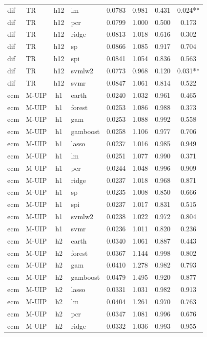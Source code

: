 \begin{ThreePartTable}
\begin{longtable}[t]{llclcccc}
dif & TR & h12 & lm & 0.0783 & 0.981 & 0.431 & 0.024**\\
dif & TR & h12 & pcr & 0.0799 & 1.000 & 0.500 & 0.173\\
dif & TR & h12 & ridge & 0.0813 & 1.018 & 0.616 & 0.302\\
dif & TR & h12 & sp & 0.0866 & 1.085 & 0.917 & 0.704\\
dif & TR & h12 & spi & 0.0841 & 1.054 & 0.836 & 0.563\\
dif & TR & h12 & svmlw2 & 0.0773 & 0.968 & 0.120 & 0.031**\\
dif & TR & h12 & svmr & 0.0847 & 1.061 & 0.814 & 0.522\\
\addlinespace
ecm & M-UIP & h1 & earth & 0.0240 & 1.032 & 0.961 & 0.465\\
ecm & M-UIP & h1 & forest & 0.0253 & 1.086 & 0.988 & 0.373\\
ecm & M-UIP & h1 & gam & 0.0253 & 1.088 & 0.992 & 0.558\\
ecm & M-UIP & h1 & gamboost & 0.0258 & 1.106 & 0.977 & 0.706\\
ecm & M-UIP & h1 & lasso & 0.0237 & 1.016 & 0.985 & 0.949\\
ecm & M-UIP & h1 & lm & 0.0251 & 1.077 & 0.990 & 0.371\\
ecm & M-UIP & h1 & pcr & 0.0244 & 1.048 & 0.996 & 0.909\\
ecm & M-UIP & h1 & ridge & 0.0237 & 1.018 & 0.968 & 0.871\\
ecm & M-UIP & h1 & sp & 0.0235 & 1.008 & 0.850 & 0.666\\
ecm & M-UIP & h1 & spi & 0.0237 & 1.017 & 0.831 & 0.515\\
ecm & M-UIP & h1 & svmlw2 & 0.0238 & 1.022 & 0.972 & 0.804\\
ecm & M-UIP & h1 & svmr & 0.0236 & 1.011 & 0.820 & 0.236\\
\addlinespace
ecm & M-UIP & h2 & earth & 0.0340 & 1.061 & 0.887 & 0.443\\
ecm & M-UIP & h2 & forest & 0.0367 & 1.144 & 0.998 & 0.802\\
ecm & M-UIP & h2 & gam & 0.0410 & 1.278 & 0.982 & 0.793\\
ecm & M-UIP & h2 & gamboost & 0.0479 & 1.495 & 0.920 & 0.877\\
ecm & M-UIP & h2 & lasso & 0.0331 & 1.031 & 0.982 & 0.913\\
ecm & M-UIP & h2 & lm & 0.0404 & 1.261 & 0.970 & 0.763\\
ecm & M-UIP & h2 & pcr & 0.0347 & 1.081 & 0.996 & 0.676\\
ecm & M-UIP & h2 & ridge & 0.0332 & 1.036 & 0.993 & 0.955\\

\end{longtable}
\end{ThreePartTable}
